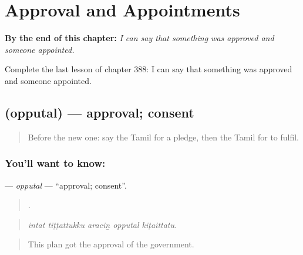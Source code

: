 
\chapter{Approval and Appointments}
\label{ch:ta-approval-and-appointments}

\begin{chapteropening}
\textbf{By the end of this chapter:} \emph{I can say that something was approved and someone appointed.}

Complete the last lesson of chapter 388: I can say that something was approved and someone appointed.
\end{chapteropening}

\section[\texorpdfstring{\ta{ஒப்புதல்} (opputal)}{ஒப்புதல் (opputal)}]{ (opputal) — approval; consent}

\label{lesson:TA-C388-opputal}



\begin{quote}
Before the new one: say the Tamil for a pledge, then the Tamil for to fulfil.
\end{quote}

\subsection*{You'll want to know: }
\textbf{} — \emph{opputal} — \textquotedblleft{}approval; consent\textquotedblright{}.

\begin{quote}
    .
\end{quote}

\begin{quote}
\emph{intat tiṭṭattukku araciṉ opputal kiṭaittatu.}
\end{quote}

\begin{quote}
This plan got the approval of the government.
\end{quote}


